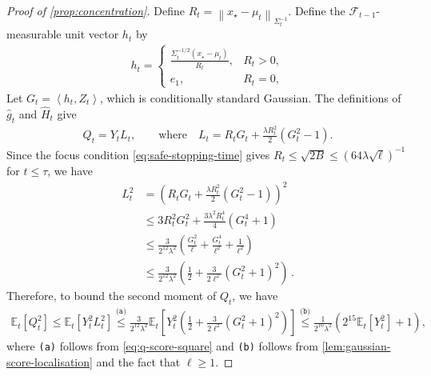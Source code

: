 \documentclass[11pt]{article}
\newcommand{\reason}[1]{\texttt{(#1)}}
\newcommand{\explan}[2]{\stackrel{\reason{#2}}{#1}}
\newcommand{\E}{\mathbb E}
\newcommand{\F}{\mathcal F}
\newcommand{\1}{\mathbf 1}
\newcommand{\ip}[2]{\left\langle #1,#2\right\rangle}
\newcommand{\normm}[2]{\left\lVert #1\right\rVert_{#2}}
\begin{document}
\begin{proof}[Proof of \cref{prop:concentration}]
    Define $R_t=\normm{x_\star-\mu_t}{\Sigma_t^{-1}}$.
    Define the $\F_{t-1}$-measurable unit vector $h_t$ by
    \begin{align}
        h_t
        =
        \begin{cases}
            \frac{\Sigma_t^{-1/2}(x_\star-\mu_t)}{R_t},
             & R_t>0, \\
            e_1,
             & R_t=0,
        \end{cases}
    \end{align}
    Let $G_t=\ip{h_t}{Z_t}$, which is conditionally standard Gaussian.  The
    definitions of $\widehat g_t$ and $\widehat H_t$ give
    \begin{align}
        Q_t
        =Y_tL_t,
        \qquad\text{where}\quad
        L_t
        =R_tG_t+\frac{\lambda R_t^2}{2}(G_t^2-1).
        \label{eq:q-score-representation}
    \end{align}
    Since the focus condition \eqref{eq:safe-stopping-time} gives
    $R_t\leq\sqrt{2B}\leq(64\lambda\sqrt\ell)^{-1}$ for
    $t\leq\tau$, we have
    \begin{align}
        L_t^2
         & =
        \left(
        R_tG_t+\frac{\lambda R_t^2}{2}(G_t^2-1)
        \right)^2
        \\
         &
        \leq
        3R_t^2G_t^2
        +\frac{3\lambda^2R_t^4}{4}
        \left(G_t^4+1\right)
        \\
         &
        \leq
        \frac{3}{2^{12}\lambda^2}
        \left(
        \frac{G_t^2}{\ell}
        +\frac{G_t^4}{\ell^2}
        +\frac{1}{\ell^2}
        \right)
        \\
         &
        \leq
        \frac{3}{2^{12}\lambda^2}
        \left(\frac12+\frac{3}{2\ell^2}(G_t^2+1)^2\right)
        \,.
        \label{eq:q-score-square}
    \end{align}
    Therefore, to bound the second moment of $Q_t$, we have
    \begin{align}
        \E_t[Q_t^2]
        \leq
        \E_t[Y_t^2L_t^2]
        \explan{\leq}{a}
        \frac{3}{2^{12}\lambda^2}
        \E_t\left[Y_t^2 \left(
            \frac12+\frac{3}{2\ell^2}(G_t^2+1)^2
            \right)\right]
        \explan{\leq}{b}
        \frac{1}{2^{10}\lambda^2}
        \left(
        2^{15}\E_t[Y_t^2]+1
        \right),
        \label{eq:q-predictable-second-moment}
    \end{align}
    where \reason{a} follows from \eqref{eq:q-score-square} and \reason{b} follows from \cref{lem:gaussian-score-localisation}
    and the fact that $\ell\geq 1$.


\end{proof}
\end{document}
